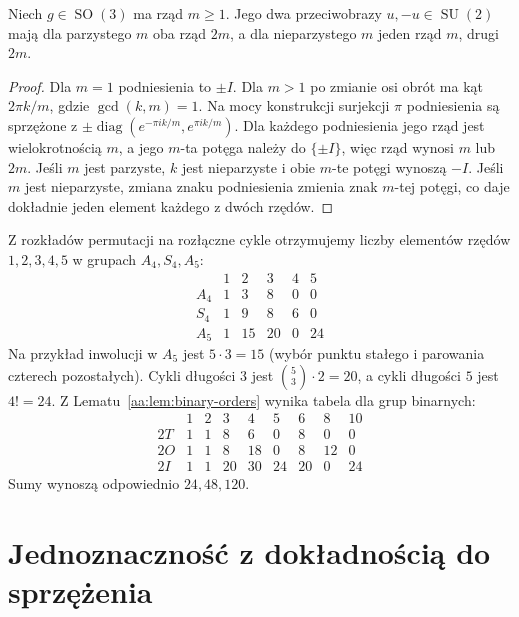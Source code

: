\begin{lemat}
\label{aa:lem:binary-orders}
Niech $g\in\operatorname{SO}(3)$ ma rząd $m\ge1$.
Jego dwa przeciwobrazy $u,-u\in\operatorname{SU}(2)$
mają dla parzystego $m$ oba rząd $2m$,
a dla nieparzystego $m$ jeden rząd $m$, drugi $2m$.
\end{lemat}
\begin{proof}
Dla $m=1$ podniesienia to $\pm I$.
Dla $m>1$ po zmianie osi obrót ma kąt $2\pi k/m$,
gdzie $\gcd(k,m)=1$. Na mocy konstrukcji surjekcji
$\pi$ podniesienia są sprzężone z
$\pm\operatorname{diag}(e^{-\pi i k/m},e^{\pi i k/m})$.
Dla każdego podniesienia jego rząd jest wielokrotnością
$m$, a jego $m$-ta potęga należy do $\{\pm I\}$,
więc rząd wynosi $m$ lub $2m$.
Jeśli $m$ jest parzyste, $k$ jest nieparzyste i obie
$m$-te potęgi wynoszą $-I$. Jeśli $m$ jest nieparzyste,
zmiana znaku podniesienia zmienia znak $m$-tej potęgi,
co daje dokładnie jeden element każdego z dwóch rzędów.
\end{proof}

\begin{przyklad}
\label{aa:prz:binary-order-distributions}
Z rozkładów permutacji na rozłączne cykle otrzymujemy
liczby elementów rzędów $1,2,3,4,5$ w grupach
$A_4,S_4,A_5$:
\[
\begin{array}{c|rrrrr}
 &1&2&3&4&5\\ \hline
 A_4&1&3&8&0&0\\
 S_4&1&9&8&6&0\\
 A_5&1&15&20&0&24
\end{array}
\]
Na przykład inwolucji w $A_5$ jest $5\cdot3=15$
(wybór punktu stałego i parowania czterech pozostałych).
Cykli długości $3$ jest $\binom53\cdot2=20$,
a cykli długości $5$ jest $4!=24$.
Z Lematu~\ref{aa:lem:binary-orders} wynika tabela
dla grup binarnych:
\[
\begin{array}{c|rrrrrrrr}
 &1&2&3&4&5&6&8&10\\ \hline
 2T&1&1&8&6&0&8&0&0\\
 2O&1&1&8&18&0&8&12&0\\
 2I&1&1&20&30&24&20&0&24
\end{array}
\]
Sumy wynoszą odpowiednio $24,48,120$.
\end{przyklad}

\section{Jednoznaczność z dokładnością do sprzężenia}

